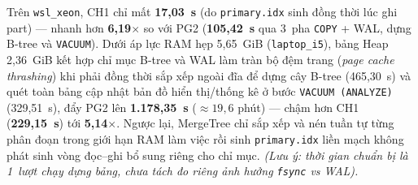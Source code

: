 \documentclass[13pt,a4paper]{report}
\begin{document}
\begin{table}[!htb]
\centering
\scriptsize
\renewcommand{\arraystretch}{1.08}
\caption{Thời gian chuẩn bị dữ liệu trên \texttt{laptop\_i5} (5,65~GiB) và \texttt{wsl\_xeon} (15,38~GiB), đơn vị giây}
\label{tab:ch4_prep}
\end{table}

Trên \texttt{wsl\_\allowbreak{}xeon}, CH1 chỉ mất \textbf{17,03~s} (do \texttt{primary.idx} sinh đồng thời lúc ghi part) --- nhanh hơn \textbf{6,19${\times}$} so với PG2 (\textbf{105,42~s} qua 3~pha \texttt{COPY} + WAL, dựng B-tree và \texttt{VACUUM}). Dưới áp lực RAM hẹp 5,65~GiB (\texttt{laptop\_\allowbreak{}i5}), bảng Heap 2,36~GiB kết hợp chỉ mục B-tree và WAL làm tràn bộ đệm trang (\textit{page cache thrashing}) khi phải đồng thời sắp xếp ngoài đĩa để dựng cây B-tree (465,30~s) và quét toàn bảng cập nhật bản đồ hiển thị/thống kê ở bước \texttt{VACUUM (\allowbreak{}ANALYZE)} (329,51~s), đẩy PG2 lên \textbf{1.178,35~s} ($\approx 19{,}6$ phút) --- chậm hơn CH1 (\textbf{229,15~s}) tới \textbf{5,14${\times}$}. Ngược lại, MergeTree chỉ sắp xếp và nén tuần tự từng phân đoạn trong giới hạn RAM làm việc rồi sinh \texttt{primary.idx} liền mạch không phát sinh vòng đọc--ghi bổ sung riêng cho chỉ mục. \textit{(Lưu ý: thời gian chuẩn bị là 1~lượt chạy dựng bảng, chưa tách đo riêng ảnh hưởng \texttt{fsync} vs WAL).}
\end{document}
